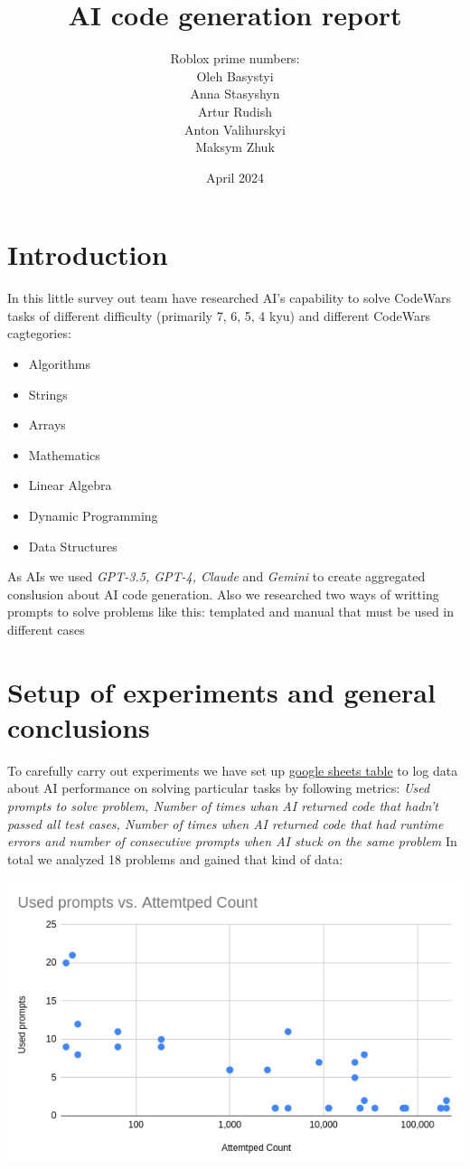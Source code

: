 \documentclass[12pt]{report}
\title{AI code generation report}
\author{Roblox prime numbers:\\\small{Oleh Basystyi}\\\small{Anna Stasyshyn}
\\\small{Artur Rudish}\\\small{Anton Valihurskyi}\\\small{Maksym Zhuk}}
\date{April 2024}
\begin{document}
	\maketitle	
	\renewcommand{\thesection}{\arabic{section}}
	\section{Introduction}
	\qquad In this little survey out team have researched AI's capability to solve CodeWars tasks of different difficulty (primarily 7, 6, 5, 4 kyu) and different CodeWars cagtegories:
	\begin{itemize}
		\itemsep0em 
		\item Algorithms
		\item Strings
		\item Arrays
		\item Mathematics
		\item Linear Algebra
		\item Dynamic Programming
		\item Data Structures
	\end{itemize}
	\qquad As AIs we used \textit{GPT-3.5, GPT-4, Claude} and \textit{Gemini} to create aggregated conslusion about AI code generation. Also we researched two ways of writting prompts to solve problems like this: templated and manual that must be used in different cases
	
	\pagebreak
	\section{Setup of experiments and general conclusions}
	\qquad To carefully carry out experiments we have set up \href{https://docs.google.com/spreadsheets/d/1qXPyAJsOOpmtxIoGqObwG5mTaLU3IWO0SQRGbjZPhEc/edit#gid=0}{google sheets table} to log data about AI performance on solving particular tasks by following metrics: \textit{Used prompts to solve problem, Number of times whan AI returned code that hadn't passed all test cases, Number of times when AI returned code that had runtime errors and number of consecutive prompts when AI stuck on the same problem} In total we analyzed 18 problems and gained that kind of data:
	
	\includegraphics[width=\textwidth]{used_prompts_attempted_relation.png}
	
\end{document}
